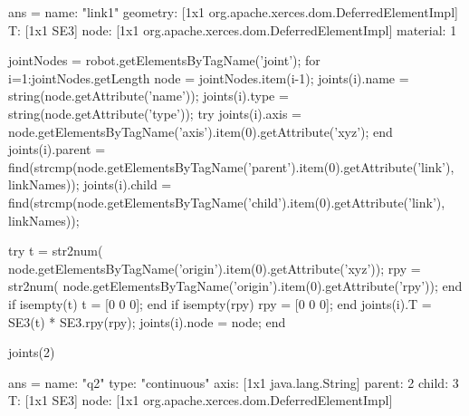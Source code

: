 \documentclass[9pt,fleqn,a4paper]{article}
\begin{document}
\begin{CodeGrey}
ans = 
        name: "link1"
    geometry: [1x1 org.apache.xerces.dom.DeferredElementImpl]
           T: [1x1 SE3]
        node: [1x1 org.apache.xerces.dom.DeferredElementImpl]
    material: 1
\end{CodeGrey}
\begin{Code}

jointNodes = robot.getElementsByTagName('joint');
for i=1:jointNodes.getLength
    node = jointNodes.item(i-1);
    joints(i).name = string(node.getAttribute('name'));
    joints(i).type = string(node.getAttribute('type'));
    try
        joints(i).axis = node.getElementsByTagName('axis').item(0).getAttribute('xyz');
    end
    joints(i).parent = find(strcmp(node.getElementsByTagName('parent').item(0).getAttribute('link'), linkNames));
    joints(i).child = find(strcmp(node.getElementsByTagName('child').item(0).getAttribute('link'), linkNames));
    
    try
        t = str2num( node.getElementsByTagName('origin').item(0).getAttribute('xyz'));
        rpy = str2num( node.getElementsByTagName('origin').item(0).getAttribute('rpy'));
    end
    if isempty(t)
            t = [0 0 0]; 
    end
    if isempty(rpy)
        rpy = [0 0 0];
    end
    joints(i).T = SE3(t) * SE3.rpy(rpy);
    joints(i).node = node;
end

joints(2)
\end{Code}
\begin{CodeGrey}
ans = 
      name: "q2"
      type: "continuous"
      axis: [1x1 java.lang.String]
    parent: 2
     child: 3
         T: [1x1 SE3]
      node: [1x1 org.apache.xerces.dom.DeferredElementImpl]
\end{CodeGrey}




\end{document}
